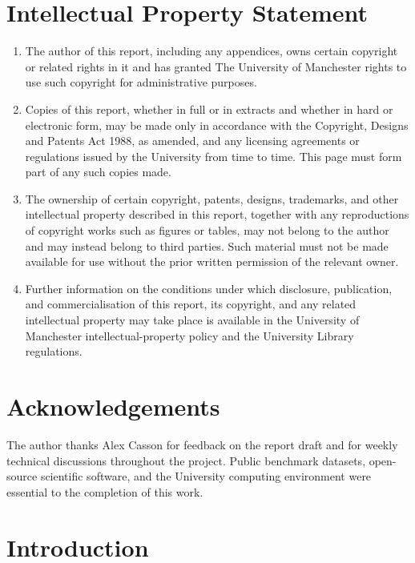 \documentclass[12pt, a4paper]{article}
\begin{document}
\section*{Intellectual Property Statement}
\begin{enumerate}
    \item The author of this report, including any appendices, owns certain copyright or related rights in it and has granted The University of Manchester rights to use such copyright for administrative purposes.
    \item Copies of this report, whether in full or in extracts and whether in hard or electronic form, may be made only in accordance with the Copyright, Designs and Patents Act 1988, as amended, and any licensing agreements or regulations issued by the University from time to time. This page must form part of any such copies made.
    \item The ownership of certain copyright, patents, designs, trademarks, and other intellectual property described in this report, together with any reproductions of copyright works such as figures or tables, may not belong to the author and may instead belong to third parties. Such material must not be made available for use without the prior written permission of the relevant owner.
    \item Further information on the conditions under which disclosure, publication, and commercialisation of this report, its copyright, and any related intellectual property may take place is available in the University of Manchester intellectual-property policy and the University Library regulations.
\end{enumerate}
\clearpage

\section*{Acknowledgements}
The author thanks Alex Casson for feedback on the report draft and for weekly technical discussions throughout the project. Public benchmark datasets, open-source scientific software, and the University computing environment were essential to the completion of this work.
\clearpage

\setcounter{page}{1}

\section{Introduction}
\end{document}
